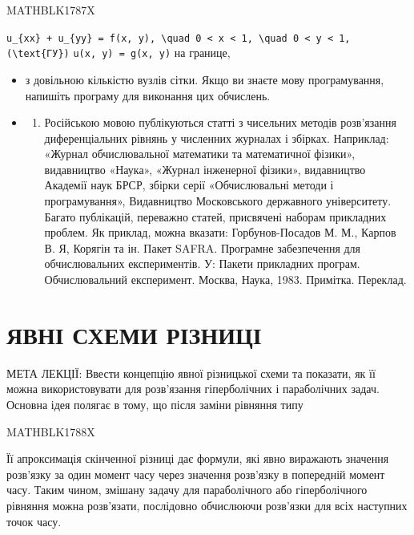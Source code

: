 \documentclass[
  ukrainian,
]{article}
\providecommand{\tightlist}{%
  \setlength{\itemsep}{0pt}\setlength{\parskip}{0pt}}
\begin{document}
MATHBLK1787X

\texttt{u\_\{xx\}\ +\ u\_\{yy\}\ =\ f(x,\ y),\ \textbackslash{}quad\ 0\ \textless{}\ x\ \textless{}\ 1,\ \textbackslash{}quad\ 0\ \textless{}\ y\ \textless{}\ 1,}
\texttt{(\textbackslash{}text\{ГУ\})} \texttt{u(x,\ y)\ =\ g(x,\ y)} на
границе,

\begin{itemize}
\tightlist
\item
  з довільною кількістю вузлів сітки. Якщо ви знаєте мову програмування,
  напишіть програму для виконання цих обчислень.
\item
  \begin{enumerate}
  \def\labelenumi{\arabic{enumi})}
  \tightlist
  \item
    Російською мовою публікуються статті з чисельних методів розв'язання
    диференціальних рівнянь у численних журналах і збірках. Наприклад:
    «Журнал обчислювальної математики та математичної фізики»,
    видавництво «Наука», «Журнал інженерної фізики», видавництво
    Академії наук БРСР, збірки серії «Обчислювальні методи і
    програмування», Видавництво Московського державного університету.
    Багато публікацій, переважно статей, присвячені наборам прикладних
    проблем. Як приклад, можна вказати: Горбунов-Посадов М. М., Карпов
    В. Я, Корягін та ін. Пакет SAFRA. Програмне забезпечення для
    обчислювальних експериментів. У: Пакети прикладних програм.
    Обчислювальний експеримент. Москва, Наука, 1983. Примітка. Переклад.
  \end{enumerate}
\end{itemize}

\section{ЯВНІ СХЕМИ
РІЗНИЦІ}\label{ux44fux432ux43dux456-ux441ux445ux435ux43cux438-ux440ux456ux437ux43dux438ux446ux456}

МЕТА ЛЕКЦІЇ: Ввести концепцію явної різницької схеми та показати, як її
можна використовувати для розв'язання гіперболічних і параболічних
задач. Основна ідея полягає в тому, що після заміни рівняння типу

MATHBLK1788X

Її апроксимація скінченної різниці дає формули, які явно виражають
значення розв'язку за один момент часу через значення розв'язку в
попередній момент часу. Таким чином, змішану задачу для параболічного
або гіперболічного рівняння можна розв'язати, послідовно обчислюючи
розв'язки для всіх наступних точок часу.
\end{document}
